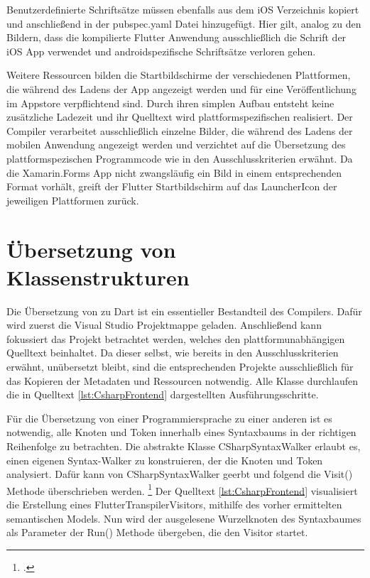  


Benutzerdefinierte Schriftsätze müssen ebenfalls aus dem iOS Verzeichnis kopiert und anschließend in der pubspec.yaml Datei hinzugefügt.  Hier gilt,  analog zu den Bildern,  dass die kompilierte Flutter Anwendung ausschließlich die Schrift der iOS App verwendet und androidspezifische Schriftsätze verloren gehen.

Weitere Ressourcen bilden die Startbildschirme der verschiedenen Plattformen,  die während des Ladens der App angezeigt werden und für eine Veröffentlichung im Appstore verpflichtend sind.  Durch ihren simplen Aufbau entsteht keine zusätzliche Ladezeit und ihr Quelltext wird plattformspezifischen realisiert.  Der Compiler verarbeitet ausschließlich einzelne Bilder, die während des Ladens der mobilen Anwendung angezeigt werden und verzichtet auf die Übersetzung des plattformspezischen Programmcode wie in den Ausschlusskriterien erwähnt.  Da die Xamarin.Forms App nicht zwangsläufig ein Bild in einem entsprechenden Format vorhält,  greift der Flutter Startbildschirm auf das LauncherIcon der jeweiligen Plattformen zurück.  

\section{Übersetzung von Klassenstrukturen}

Die Übersetzung von \Csharp zu Dart ist ein essentieller Bestandteil des Compilers.  Dafür wird zuerst die Visual Studio Projektmappe geladen.  Anschließend kann fokussiert das Projekt betrachtet werden, welches den plattformunabhängigen Quelltext beinhaltet.  Da dieser selbst, wie bereits in den Ausschlusskriterien erwähnt,  unübersetzt bleibt, sind die entsprechenden Projekte ausschließlich für das Kopieren der Metadaten und Ressourcen notwendig.  Alle Klasse durchlaufen die in Quelltext \ref{lst:CsharpFrontend} dargestellten Ausführungsschritte. 

Für die Übersetzung von einer Programmiersprache zu einer anderen ist es notwendig,  alle Knoten und Token innerhalb eines Syntaxbaums in der richtigen Reihenfolge zu betrachten.  Die abstrakte Klasse \glq CSharpSyntaxWalker\grq{} erlaubt es,  einen eigenen \glq Syntax-Walker\grq{} zu konstruieren,  der die Knoten und Token analysiert.  Dafür kann von \glq CSharpSyntaxWalker\grq{} geerbt und folgend die \glq Visit()\grq{} Methode überschrieben werden.  \footcite[Vgl.][Abgerufen am \today]{Varty2014}  Der Quelltext \ref{lst:CsharpFrontend} visualisiert die Erstellung eines \glq FlutterTranspilerVisitors\grq ,  mithilfe des vorher ermittelten semantischen Models.  Nun wird der ausgelesene Wurzelknoten des Syntaxbaumes als Parameter der \glq Run()\grq{} Methode übergeben,  die den \glq Visitor\grq{} startet.  

